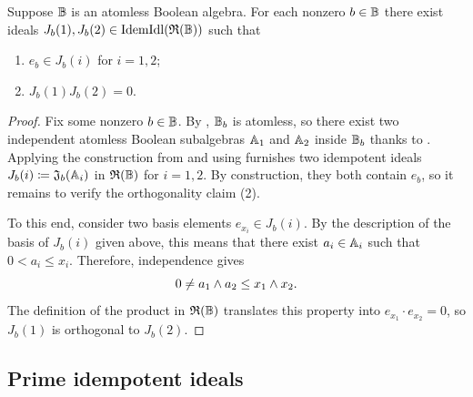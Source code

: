 \documentclass{amsart}
\begin{document}
    \begin{Lem}\label{lem:orthogonalideals}
        Suppose $\mathbb{B}$ is an atomless Boolean algebra. For each nonzero $b \in \mathbb{B}$ there exist ideals $J_b(1), J_b(2) \in \mathrm{IdemIdl}(\mathfrak{R}(\mathbb{B}))$ such that
            \begin{enumerate}
                \item $e_b \in J_b(i)$ for $i=1,2$; 
                \item $J_b(1)J_b(2) = 0$.
            \end{enumerate}
    \end{Lem}
    \begin{proof}
        Fix some nonzero $b \in \mathbb{B}$. By , $\mathbb{B}_b$ is atomless, so there exist two independent atomless Boolean subalgebras $\mathbb{A}_1$ and $\mathbb{A}_2$ inside $\mathbb{B}_b$ thanks to . Applying the construction from  and using  furnishes two idempotent ideals $J_b(i)\coloneqq \mathfrak{J}_{b}(\mathbb{A}_i)$ in $\mathfrak{R}(\mathbb{B})$ for $i=1,2$. By construction, they both contain $e_b$, so it remains to verify the orthogonality claim (2).
    
        To this end, consider two basis elements $e_{x_i} \in J_b(i)$. By the description of the basis of $J_b(i)$ given above, this means that there exist $a_i \in \mathbb{A}_i$ such that $0 < a_i \leq x_i$. Therefore, independence gives
            \[
                0 \neq a_1 \land a_2 \leq x_1 \land x_2.
            \]
        The definition of the product in $\mathfrak{R}(\mathbb{B})$ translates this property into $e_{x_1}\cdot e_{x_2} = 0$, so $J_b(1)$ is orthogonal to $J_b(2)$.
    \end{proof}
    
    \subsection{Prime idempotent ideals}\label{ssec:points}
    
\end{document}
